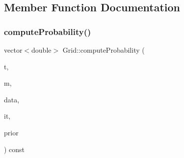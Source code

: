 \subsection{Member Function Documentation}
\mbox{\label{class_grid_a15b32bc4e110b63b3506cd932afa5e2a}} 
\subsubsection{\texorpdfstring{computeProbability()}{computeProbability()}}
{\footnotesize\ttfamily vector$<$double$>$ Grid\+::compute\+Probability (\begin{DoxyParamCaption}\item[{unsigned long}]{t,  }\item[{\mbox{\hyperlink{class_mobile_phone}{Mobile\+Phone}} $\ast$}]{m,  }\item[{vector$<$ \mbox{\hyperlink{class_antenna_info}{Antenna\+Info}} $>$ \&}]{data,  }\item[{pair$<$ \mbox{\hyperlink{_agents_collection_8h_afde47bc45d604b8b8c72755072376679}{um\+\_\+iterator}}, \mbox{\hyperlink{_agents_collection_8h_afde47bc45d604b8b8c72755072376679}{um\+\_\+iterator}} $>$}]{it,  }\item[{\mbox{\hyperlink{_prior_type_8h_a61286c562e68de246982fc393a7c23a5}{Prior\+Type}}}]{prior }\end{DoxyParamCaption}) const}

